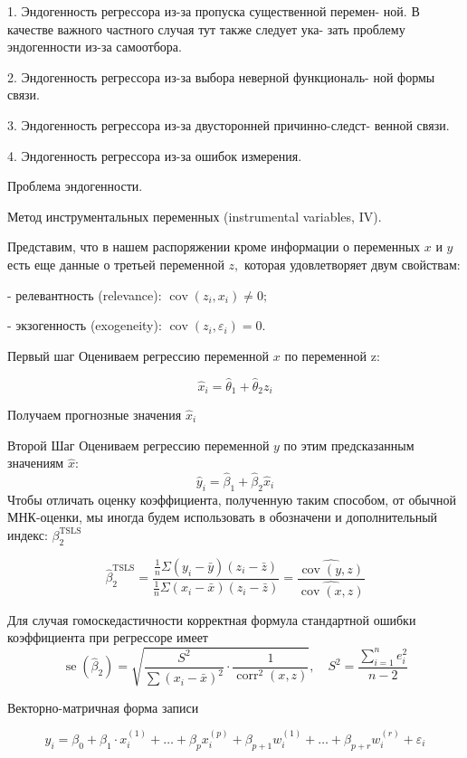 \documentclass[a4paper,8pt]{article} %
\begin{document}
1. Эндогенность регрессора из-за пропуска существенной перемен-
ной. В качестве важного частного случая тут также следует ука-
зать проблему эндогенности из-за самоотбора.

2. Эндогенность регрессора из-за выбора неверной функциональ-
ной формы связи.

3. Эндогенность регрессора из-за двусторонней причинно-следст-
венной связи.

4. Эндогенность регрессора из-за ошибок измерения.

Проблема  эндогенности.



Метод инструментальных переменных (instrumental variables, IV). 

Представим, что в нашем распоряжении кроме информации о переменных $x$ и $y$ есть еще данные о третьей переменной $z,$ которая удовлетворяет двум свойствам:

- релевантность (relevance): $\operatorname{cov}\left(z_{i}, x_{i}\right) \neq 0 ;$

- экзогенность (exogeneity): $\operatorname{cov}\left(z_{i}, \varepsilon_{i}\right)=0 .$

Первый шаг Оцениваем регрессию переменной $x$ по переменной z:

$$
\hat{x}_{i}=\hat{\theta}_{1}+\hat{\theta}_{2} z_{i}
$$

Получаем прогнозные значения $\hat{x}_{i}$

Второй Шаг Оцениваем регрессию переменной $y$ по этим предсказанным значениям $\hat{x}:$
$$
\hat{y}_{i}=\hat{\beta}_{1}+\hat{\beta}_{2} \hat{x}_{i}
$$
Чтобы отличать оценку коэффициента, полученную таким способом, от обычной МНК-оценки, мы иногда будем использовать в обозначени и дополнительный индекс: $\beta_{2}^{\text {TSLS }}$


$$
\hat{\beta}_{2}^{\mathrm{TSLS}}=\frac{\frac{1}{n} \Sigma\left(y_{i}-\bar{y}\right)\left(z_{i}-\bar{z}\right)}{\frac{1}{n} \Sigma\left(x_{i}-\bar{x}\right)\left(z_{i}-\bar{z}\right)}=\frac{\widehat{\operatorname{cov}(y, z)}}{\widehat{\operatorname{cov}(x, z)}}
$$


Для случая гомоскедастичности корректная формула стандартной ошибки коэффициента при регрессоре имеет
$$
\operatorname{se}\left(\hat{\beta}_{2}\right)=\sqrt{\frac{S^{2}}{\sum\left(x_{i}-\bar{x}\right)^{2}} \cdot \frac{1}{\operatorname{corr}^{2}(x, z)}}, \quad S^{2}=\frac{\sum_{i=1}^{n} e_{i}^{2}}{n-2}
$$


Векторно-матричная форма записи

$$
y_{i}=\beta_{0}+\beta_{1} \cdot x_{i}^{(1)}+\ldots+\beta_{p} x_{i}^{(p)}+\beta_{p+1} w_{i}^{(1)}+\ldots+\beta_{p+r} w_{i}^{(r)}+\varepsilon_{i}
$$
\end{document}
